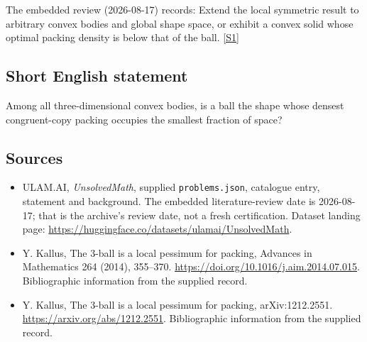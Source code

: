 \documentclass[11pt,a4paper]{article}
\newcommand{\sref}[2]{\hyperlink{source:#1:#2}{[S#2]}}
\begin{document}
The embedded review (2026-08-17) records: Extend the local symmetric result to arbitrary convex bodies and global shape space, or exhibit a convex solid whose optimal packing density is below that of the ball. \sref{statement}{1}

\subsection{Short English statement}

Among all three-dimensional convex bodies, is a ball the shape whose densest congruent-copy packing occupies the smallest fraction of space?

\subsection{Sources}

{\small

\begin{itemize}

\item[\hypertarget{source:statement:1}{S1}] ULAM.AI, \emph{UnsolvedMath}, supplied \texttt{problems.json}, catalogue entry, statement and background. The embedded literature-review date is 2026-08-17; that is the archive’s review date, not a fresh certification. Dataset landing page: \url{https://huggingface.co/datasets/ulamai/UnsolvedMath}.

\item[\hypertarget{source:statement:2}{S2}] Y. Kallus, The 3-ball is a local pessimum for packing, Advances in Mathematics 264 (2014), 355–370. \url{https://doi.org/10.1016/j.aim.2014.07.015}. Bibliographic information from the supplied record.

\item[\hypertarget{source:statement:3}{S3}] Y. Kallus, The 3-ball is a local pessimum for packing, arXiv:1212.2551. \url{https://arxiv.org/abs/1212.2551}. Bibliographic information from the supplied record.

\end{itemize}

}

\label{end:statement}
\end{document}
